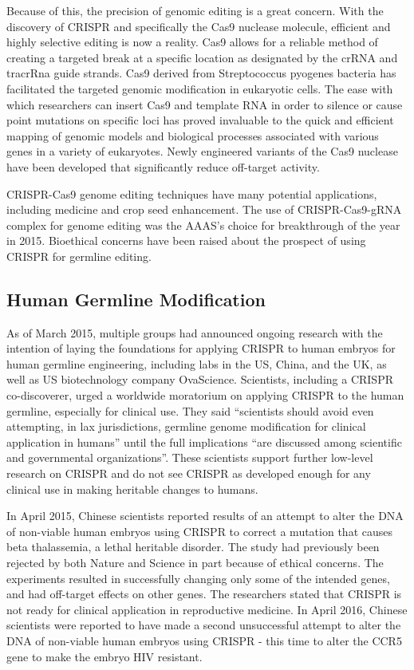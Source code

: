 Because of this, the precision of genomic editing is a great concern. With the discovery of CRISPR and specifically the Cas9 nuclease molecule, efficient and highly selective editing is now a reality. Cas9 allows for a reliable method of creating a targeted break at a specific location as designated by the crRNA and tracrRna guide strands. Cas9 derived from Streptococcus pyogenes bacteria has facilitated the targeted genomic modification in eukaryotic cells. The ease with which researchers can insert Cas9 and template RNA in order to silence or cause point mutations on specific loci has proved invaluable to the quick and efficient mapping of genomic models and biological processes associated with various genes in a variety of eukaryotes. Newly engineered variants of the Cas9 nuclease have been developed that significantly reduce off-target activity.

CRISPR-Cas9 genome editing techniques have many potential applications, including medicine and crop seed enhancement. The use of CRISPR-Cas9-gRNA complex for genome editing was the AAAS's choice for breakthrough of the year in 2015. Bioethical concerns have been raised about the prospect of using CRISPR for germline editing.

\hypertarget{human-germline-modification}{%
\subsection{Human Germline Modification}\label{human-germline-modification}}

As of March 2015, multiple groups had announced ongoing research with the intention of laying the foundations for applying CRISPR to human embryos for human germline engineering, including labs in the US, China, and the UK, as well as US biotechnology company OvaScience. Scientists, including a CRISPR co-discoverer, urged a worldwide moratorium on applying CRISPR to the human germline, especially for clinical use. They said ``scientists should avoid even attempting, in lax jurisdictions, germline genome modification for clinical application in humans'' until the full implications ``are discussed among scientific and governmental organizations''. These scientists support further low-level research on CRISPR and do not see CRISPR as developed enough for any clinical use in making heritable changes to humans.

In April 2015, Chinese scientists reported results of an attempt to alter the DNA of non-viable human embryos using CRISPR to correct a mutation that causes beta thalassemia, a lethal heritable disorder. The study had previously been rejected by both Nature and Science in part because of ethical concerns. The experiments resulted in successfully changing only some of the intended genes, and had off-target effects on other genes. The researchers stated that CRISPR is not ready for clinical application in reproductive medicine. In April 2016, Chinese scientists were reported to have made a second unsuccessful attempt to alter the DNA of non-viable human embryos using CRISPR - this time to alter the CCR5 gene to make the embryo HIV resistant.

